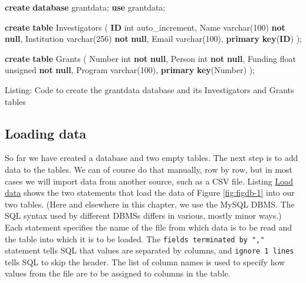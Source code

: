 \documentclass[]{krantz}
\newenvironment{Shaded}{\begin{snugshade}}{\end{snugshade}}
\newcommand{\KeywordTok}[1]{\textcolor[rgb]{0.13,0.29,0.53}{\textbf{#1}}}
\newcommand{\DataTypeTok}[1]{\textcolor[rgb]{0.13,0.29,0.53}{#1}}
\newcommand{\DecValTok}[1]{\textcolor[rgb]{0.00,0.00,0.81}{#1}}
\newcommand{\NormalTok}[1]{#1}
\begin{document}
\begin{Shaded}
\begin{Highlighting}[]
\KeywordTok{create} \KeywordTok{database}\NormalTok{ grantdata;}
\KeywordTok{use}\NormalTok{ grantdata;}

\KeywordTok{create} \KeywordTok{table}\NormalTok{ Investigators (}
    \KeywordTok{ID} \DataTypeTok{int}\NormalTok{ auto_increment,}
\NormalTok{    Name }\DataTypeTok{varchar}\NormalTok{(}\DecValTok{100}\NormalTok{) }\KeywordTok{not} \KeywordTok{null}\NormalTok{,}
\NormalTok{    Institution }\DataTypeTok{varchar}\NormalTok{(}\DecValTok{256}\NormalTok{) }\KeywordTok{not} \KeywordTok{null}\NormalTok{,}
\NormalTok{    Email }\DataTypeTok{varchar}\NormalTok{(}\DecValTok{100}\NormalTok{),}
    \KeywordTok{primary} \KeywordTok{key}\NormalTok{(}\KeywordTok{ID}\NormalTok{)}
\NormalTok{);}

\KeywordTok{create} \KeywordTok{table}\NormalTok{ Grants ( }
    \DataTypeTok{Number} \DataTypeTok{int} \KeywordTok{not} \KeywordTok{null}\NormalTok{,}
\NormalTok{    Person }\DataTypeTok{int} \KeywordTok{not} \KeywordTok{null}\NormalTok{,}
\NormalTok{    Funding }\DataTypeTok{float}\NormalTok{ unsigned }\KeywordTok{not} \KeywordTok{null}\NormalTok{,}
\NormalTok{    Program }\DataTypeTok{varchar}\NormalTok{(}\DecValTok{100}\NormalTok{),}
    \KeywordTok{primary} \KeywordTok{key}\NormalTok{(}\DataTypeTok{Number}\NormalTok{)}
\NormalTok{);}
\end{Highlighting}
\end{Shaded}

Listing: Code to create the grantdata database and its Investigators and
Grants tables

\subsection{Loading data}\label{loading-data}

So far we have created a database and two empty tables. The next step is
to add data to the tables. We can of course do that manually, row by
row, but in most cases we will import data from another source, such as
a CSV file. Listing \protect\hyperlink{list:db2}{Load data} shows the
two statements that load the data of Figure \ref{fig:figdb-1} into our
two tables. (Here and elsewhere in this chapter, we use the MySQL DBMS.
The SQL syntax used by different DBMSs differs in various, mostly minor
ways.) Each statement specifies the name of the file from which data is
to be read and the table into which it is to be loaded. The
\texttt{fields\ terminated\ by\ ","} statement tells SQL that values are
separated by columns, and \texttt{ignore\ 1\ lines} tells SQL to skip
the header. The list of column names is used to specify how values from
the file are to be assigned to columns in the table.
\end{document}
